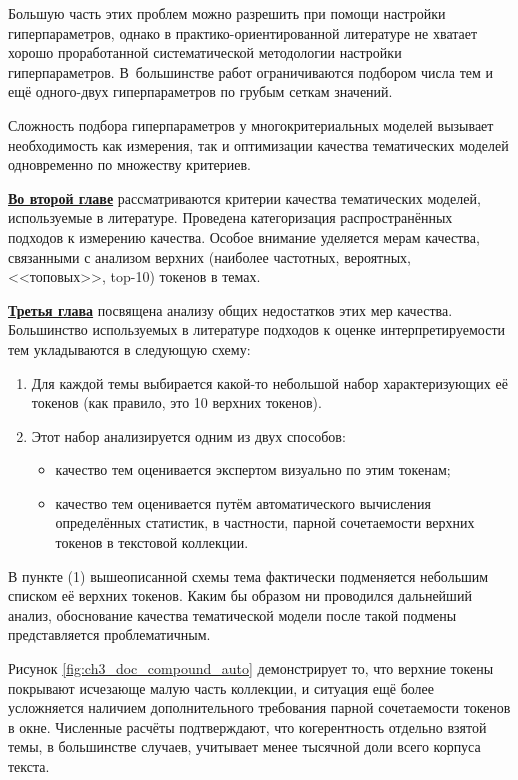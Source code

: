 Большую часть этих проблем можно разрешить при помощи настройки гиперпараметров, однако в практико-ориентированной литературе не хватает хорошо проработанной систематической методологии настройки гиперпараметров. В~большинстве работ ограничиваются подбором числа тем и ещё одного-двух гиперпараметров по грубым сеткам значений.  

Сложность подбора гиперпараметров у многокритериальных моделей вызывает необходимость как измерения, так и оптимизации качества тематических моделей одновременно по множеству критериев.

\underline{\textbf{Во второй главе}} рассматриваются критерии качества тематических моделей, используемые в литературе. Проведена категоризация распространённых подходов к измерению качества. Особое внимание уделяется мерам качества, связанными с анализом верхних (наиболее частотных, вероятных, <<топовых>>, top-10) токенов в темах.

\underline{\textbf{Третья глава}} посвящена анализу общих недостатков этих мер качества. Большинство используемых в литературе подходов к оценке интерпретируемости тем укладываются в следующую схему:

\begin{enumerate}
    \item Для каждой темы выбирается какой-то небольшой набор характеризующих её токенов (как правило, это 10 верхних токенов).
    \item{Этот набор анализируется одним из двух способов:
    \begin{itemize}
        \item качество тем оценивается экспертом визуально по этим токенам;
        \item качество тем оценивается путём автоматического вычисления определённых статистик, в частности, парной сочетаемости верхних токенов в текстовой коллекции.
    \end{itemize}
    }
\end{enumerate}

В пункте (1) вышеописанной схемы тема фактически подменяется небольшим списком её верхних токенов. Каким бы образом ни проводился дальнейший анализ, обоснование качества тематической модели после такой подмены представляется проблематичным.

Рисунок \ref{fig:ch3_doc_compound_auto} демонстрирует то, что верхние токены покрывают исчезающе малую часть коллекции, и ситуация ещё более усложняется наличием дополнительного требования парной сочетаемости токенов в окне. Численные расчёты подтверждают, что когерентность отдельно взятой темы, в большинстве случаев, учитывает менее тысячной доли всего корпуса текста.

